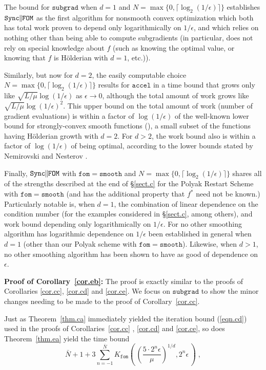 \documentclass[reqno, 11pt]{amsart}
\numberwithin{equation}{section}
\newcommand{\shrink}[1]{ {\scriptstyle {\textstyle {#1} } } }
\newcommand{\smfrac}[2]{ \shrink{ \frac{#1}{#2} } }
\newcommand{\nt}{\negthinspace}
\newcommand{\fom}{\mathtt{fom}}
\newcommand{\parfom}{\parallel \nt \nt  \mathtt{FOM}}
\newcommand{\subgrad}{\mathtt{subgrad}}
\newcommand{\accel}{\mathtt{accel}}
\newcommand{\smooth}{\mathtt{smooth}}
\newcommand{\sparfom}{\mathtt{Sync} \nt \nt  \parfom}
\begin{document}
The bound for $ \subgrad $ when $ d = 1 $ and $ N = \max \{ 0, \lceil \log_2(1/\epsilon) \rceil \} $ establishes $ \sparfom $ as the first algorithm for nonsmooth convex optimization which both has total work proven to depend only logarithmically on $ 1/\epsilon $, and which relies on nothing other than being able to compute subgradients (in particular, does not rely on special knowledge about $ f $ (such as knowing the optimal value, or knowing that $ f $ is H\"{o}lderian with $ d = 1 $, etc.)).  

Similarly, but now for $ d = 2 $,  the easily computable choice $ N = \max \{ 0, \lceil \log_2(1/ \epsilon) \rceil \} $ results for $ \accel $ in a time bound that grows only like $ \sqrt{L/ \mu} \log(1/\epsilon) $ as $ \epsilon \rightarrow 0 $, although the total amount of work grows like $ \sqrt{L/\mu} \log(1/\epsilon)^2 $. This upper bound on the total amount of work (number of gradient evaluations) is within a factor of $ \log(1/\epsilon) $ of the well-known lower bound for strongly-convex smooth functions (\cite{nemirovsky1983problem}), a small subset of the functions having H\"{o}lderian growth with $ d = 2 $.  For $ d > 2 $, the work bound also is within a factor of $ \log(1/ \epsilon) $ of being optimal, according to the lower bounds stated by Nemirovski and Nesterov \cite[page 26]{NemNes85}. 

Finally, $ \sparfom $ with $ \fom = \smooth $ and $ N = \max \{ 0, \lceil \log_2(1/\epsilon) \rceil \} $ shares all of the strengths described at the end of \S\ref{sect.c}  for the Polyak Restart Scheme with $ \fom = \smooth $ (and has the additional property that $ f^* $ need not be known.) Particularly notable is, when $ d = 1 $, the combination of linear dependence on the condition number (for the examples considered in \S\ref{sect.c}, among others), and work bound depending only logarithmically on $ 1/\epsilon $. For no other smoothing algorithm has logarithmic dependence on $ 1/\epsilon $ been established in general when $ d = 1 $ (other than our Polyak scheme with $ \fom = \smooth $). Likewise, when $ d > 1 $, no other smoothing algorithm has been shown to have as good of dependence on $ \epsilon $.


\noindent 
{\bf Proof of Corollary~\ref{cor.eb}:} The proof is exactly similar to the proofs of Corollaries \ref{cor.cc}, \ref{cor.cd}  and \ref{cor.ce}. We focus on $ \subgrad $ to show the minor changes needing to be made to the proof of Corollary~\ref{cor.cc}. 

Just as Theorem~\ref{thm.ca}  immediately yielded the iteration bound (\ref{eqn.cd})  used in the proofs of Corollaries~\ref{cor.cc} , \ref{cor.cd}  and \ref{cor.ce}, so does Theorem~\ref{thm.ea}  yield the time bound 
\begin{equation}  \label{eqn.ed} 
  \bar{N} + 1 + 3 \sum_{n=-1}^{\bar{N}} K_{\fom} \left( \, \left( \smfrac{5 \cdot 2^n \epsilon }{\mu } \right)^{1/d}, 2^n \epsilon \, \right)  \; ,
  \end{equation}
  
\end{document}
